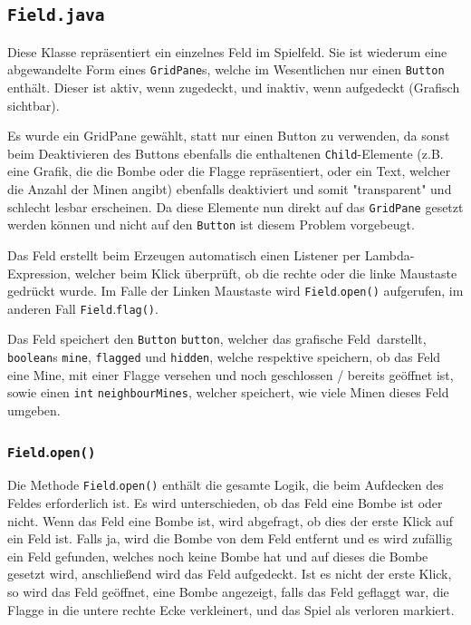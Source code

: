 \documentclass[oneside,12pt]{scrartcl}
\newcommand*{\EnableHyphenationInTexttt}{\hyphenchar\font=45\relax}%
\newcommand{\class}[1]{\textcolor{Green4}{\bcode{#1}}}
\newcommand{\method}[1]{\textcolor{Orange3}{\bcode{#1()}}}
\newcommand{\attribute}[1]{\textcolor{SkyBlue3}{\bcode{#1}}}
\newcommand{\classattribute}[2]{\class{#1} \attribute{#2}}
\newcommand{\methodcall}[2]{\class{#1}.\method{#2}}
\newcommand{\bcode}[1]{\texttt{\EnableHyphenationInTexttt#1}}
\begin{document}
\subsection{\class{Field.java}}
\label{sec:Field}
Diese Klasse repräsentiert ein einzelnes Feld im Spielfeld. Sie ist wiederum eine abgewandelte Form eines \class{GridPane}s, welche im Wesentlichen nur einen \class{Button} enthält. Dieser ist aktiv, wenn zugedeckt, und inaktiv, wenn aufgedeckt (Grafisch sichtbar).

Es wurde ein GridPane gewählt, statt nur einen Button zu verwenden, da sonst beim Deaktivieren des Buttons ebenfalls die enthaltenen \attribute{Child}-Elemente (z.B. eine Grafik, die die Bombe oder die Flagge repräsentiert, oder ein Text, welcher die Anzahl der Minen angibt) ebenfalls deaktiviert und somit "transparent" und schlecht lesbar erscheinen. Da diese Elemente nun direkt auf das \class{GridPane} gesetzt werden können und nicht auf den \class{Button} ist diesem Problem vorgebeugt.

Das Feld erstellt beim Erzeugen automatisch einen Listener per Lambda-Expression, welcher beim Klick überprüft, ob die rechte oder die linke Maustaste gedrückt wurde. Im Falle der Linken Maustaste wird \methodcall{Field}{open} aufgerufen, im anderen Fall \methodcall{Field}{flag}.

Das Feld speichert den \classattribute{Button}{button}, welcher das grafische \glqq Feld\grqq\ darstellt, \class{boolean}s \attribute{mine}, \attribute{flagged} und \attribute{hidden}, welche respektive speichern, ob das Feld eine Mine, mit einer Flagge versehen und noch geschlossen / bereits geöffnet ist, sowie einen \classattribute{int}{neighbourMines}, welcher speichert, wie viele Minen dieses Feld umgeben.

\subsubsection{\methodcall{Field}{open}}
Die Methode \methodcall{Field}{open} enthält die gesamte Logik, die beim Aufdecken des Feldes erforderlich ist. Es wird unterschieden, ob das Feld eine Bombe ist oder nicht. Wenn das Feld eine Bombe ist, wird abgefragt, ob dies der erste Klick auf ein Feld ist. Falls ja, wird die Bombe von dem Feld entfernt und es wird zufällig ein Feld gefunden, welches noch keine Bombe hat und auf dieses die Bombe gesetzt wird, anschließend wird das Feld aufgedeckt. Ist es nicht der erste Klick, so wird das Feld geöffnet, eine Bombe angezeigt, falls das Feld geflaggt war, die Flagge in die untere rechte Ecke verkleinert, und das Spiel als verloren markiert.
\end{document}

